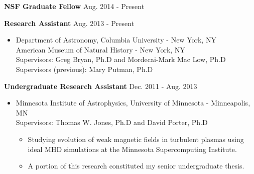 \documentclass[10pt]{article}
\newenvironment{innerlist}[1][\enskip\textbullet]%
        {\begin{itemize}[#1,leftmargin=*,parsep=0pt,itemsep=0pt,topsep=0pt,partopsep=0pt]}
        {\end{itemize}}
\begin{document}
\textbf{NSF Graduate Fellow} \hfill {Aug. 2014 - Present}

\textbf{Research Assistant} \hfill {Aug. 2013 - Present}
\begin{innerlist}

\item[] Department of Astronomy, Columbia University - New York, NY\\
        American Museum of Natural History - New York, NY\\
    Supervisors: Greg Bryan, Ph.D and Mordecai-Mark Mac Low, Ph.D\\
		Supervisors (previous): Mary Putman, Ph.D
\end{innerlist}

\iflong
\textbf{Undergraduate Research Assistant} \hfill {Dec. 2011 - Aug. 2013}
\begin{innerlist}

\item[] Minnesota Institute of Astrophysics, University of Minnesota - Minneapolis, MN\\
		Supervisors: Thomas W. Jones, Ph.D and David Porter, Ph.D
		\iflong
		\begin{innerlist}
		\item Studying evolution of weak magnetic fields in turbulent plasmas using
		ideal MHD simulations at the Minnesota Supercomputing Institute.
		\item A portion of this research constituted my senior undergraduate thesis.
		\end{innerlist}
		\fi
\end{innerlist}
\end{document}

